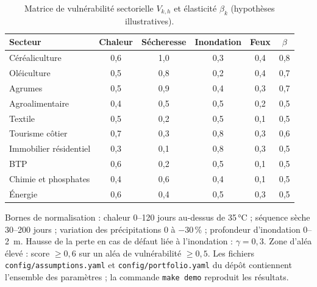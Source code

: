 \documentclass[11pt,a4paper]{article}
\begin{document}
\begin{table}[ht]
\centering\small
\caption{Matrice de vulnérabilité sectorielle $V_{k,h}$ et élasticité $\beta_k$ (hypothèses illustratives).}\label{tab:hyp}
\begin{tabular}{@{}lccccc@{}}
\toprule
Secteur & Chaleur & Sécheresse & Inondation & Feux & $\beta$ \\
\midrule
Céréaliculture & 0{,}6 & 1{,}0 & 0{,}3 & 0{,}4 & 0{,}8 \\
Oléiculture & 0{,}5 & 0{,}8 & 0{,}2 & 0{,}4 & 0{,}7 \\
Agrumes & 0{,}5 & 0{,}9 & 0{,}4 & 0{,}3 & 0{,}7 \\
Agroalimentaire & 0{,}4 & 0{,}5 & 0{,}5 & 0{,}2 & 0{,}5 \\
Textile & 0{,}5 & 0{,}2 & 0{,}5 & 0{,}1 & 0{,}5 \\
Tourisme côtier & 0{,}7 & 0{,}3 & 0{,}8 & 0{,}3 & 0{,}6 \\
Immobilier résidentiel & 0{,}3 & 0{,}1 & 0{,}8 & 0{,}3 & 0{,}5 \\
BTP & 0{,}6 & 0{,}2 & 0{,}5 & 0{,}1 & 0{,}5 \\
Chimie et phosphates & 0{,}4 & 0{,}6 & 0{,}4 & 0{,}1 & 0{,}5 \\
Énergie & 0{,}6 & 0{,}4 & 0{,}5 & 0{,}3 & 0{,}5 \\
\bottomrule
\end{tabular}
\end{table}

\noindent Bornes de normalisation : chaleur 0--120 jours au-dessus de 35\,°C ; séquence sèche 30--200 jours ; variation des précipitations 0 à $-30$\,\% ; profondeur d'inondation 0--2~m. Hausse de la perte en cas de défaut liée à l'inondation : $\gamma = 0{,}3$. Zone d'aléa élevé : score $\geq 0{,}6$ sur un aléa de vulnérabilité $\geq 0{,}5$. Les fichiers \texttt{config/assumptions.yaml} et \texttt{config/portfolio.yaml} du dépôt contiennent l'ensemble des paramètres ; la commande \texttt{make demo} reproduit les résultats.
\end{document}
